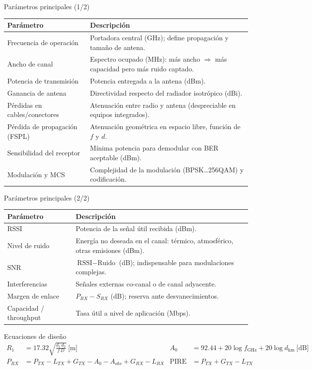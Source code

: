 \begin{frame}{Parámetros principales (1/2)}
  \small
  \begin{tabularx}{\textwidth}{@{}p{3.6cm}L@{}}
    \toprule
    \textbf{Parámetro} & \textbf{Descripción} \\ \midrule
    Frecuencia de operación & Portadora central (GHz); define propagación y tamaño de antena. \\
    Ancho de canal & Espectro ocupado (MHz): más ancho $\Rightarrow$ más capacidad pero más ruido captado. \\
    Potencia de transmisión & Potencia entregada a la antena (dBm). \\
    Ganancia de antena & Directividad respecto del radiador isotrópico (dBi). \\
    Pérdidas en cables/conectores & Atenuación entre radio y antena (despreciable en equipos integrados). \\
    Pérdida de propagación (FSPL) & Atenuación geométrica en espacio libre, función de $f$ y $d$. \\
    Sensibilidad del receptor & Mínima potencia para demodular con BER aceptable (dBm). \\
    Modulación y MCS & Complejidad de la modulación (BPSK\dots256QAM) y codificación. \\
    \bottomrule
  \end{tabularx}
\end{frame}

\begin{frame}{Parámetros principales (2/2)}
  \small
  \begin{tabularx}{\textwidth}{@{}p{3.6cm}L@{}}
    \toprule
    \textbf{Parámetro} & \textbf{Descripción} \\ \midrule
    RSSI & Potencia de la señal útil recibida (dBm). \\
    Nivel de ruido & Energía no deseada en el canal: térmico, atmosférico, otras emisiones (dBm). \\
    SNR & $\text{RSSI} - \text{Ruido}$ (dB); indispensable para modulaciones complejas. \\
    Interferencias & Señales externas co-canal o de canal adyacente. \\
    Margen de enlace & $P_{RX} - S_{RX}$ (dB); reserva ante desvanecimientos. \\
    Capacidad / throughput & Tasa útil a nivel de aplicación (Mbps). \\
    \bottomrule
  \end{tabularx}
  \vspace{6pt}
  \begin{block}{Ecuaciones de diseño}
    \vspace{-8pt}
    \begin{align*}
      R_1 &= 17.32\sqrt{\frac{d_1\,d_2}{f\,D}}\ \text{[m]} &
      A_0 &= 92.44 + 20\log f_{\text{GHz}} + 20\log d_{\text{km}}\ \text{[dB]}\\
      P_{RX} &= P_{TX} - L_{TX} + G_{TX} - A_0 - A_{obs} + G_{RX} - L_{RX} &
      \text{PIRE} &= P_{TX} + G_{TX} - L_{TX}
    \end{align*}
  \end{block}
\end{frame}
